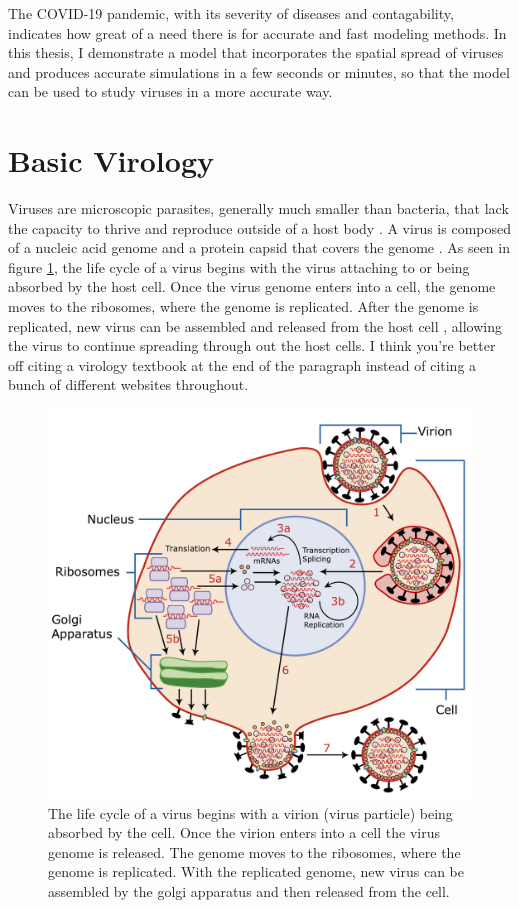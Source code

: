 The COVID-19 pandemic, with its severity of diseases and contagability, indicates
how great of a need there is for accurate and fast modeling methods. In this thesis, I demonstrate a model that incorporates the spatial spread of viruses and produces accurate simulations in a few seconds or minutes, so that the model can be used to study viruses in a more accurate way. 

\section{Basic Virology}
Viruses are microscopic parasites, generally much smaller than bacteria, that lack the capacity to thrive and reproduce outside of a host body \citep{website2}. A virus is composed of a nucleic acid genome and a protein capsid that covers the genome \citep{website3}. As seen in figure \ref{fig:Virus_Replication}, the life cycle of a virus begins with the virus attaching to or being absorbed by the host cell. Once the virus genome enters into a cell, the genome moves to the ribosomes, where the genome is replicated. After the genome is replicated, new virus can be assembled and released from the host cell \citep{Kaiser}, allowing the virus to continue spreading through out the host cells. \color{red} I think you're better off citing a virology textbook at the end of the paragraph instead of citing a bunch of different websites throughout.\color{black}

\begin{figure}[h]
    \centering
    \includegraphics[width=0.6\linewidth]{Figures/Virus_Replication_large.pdf}
    \caption{The life cycle of a virus begins with a virion (virus particle) being absorbed by the cell. Once the virion enters into a cell the virus genome is released. The genome moves to the ribosomes, where the genome is replicated. With the replicated genome, new virus can be assembled by the golgi apparatus and then released from the cell.}
    \label{fig:Virus_Replication}
\end{figure}


